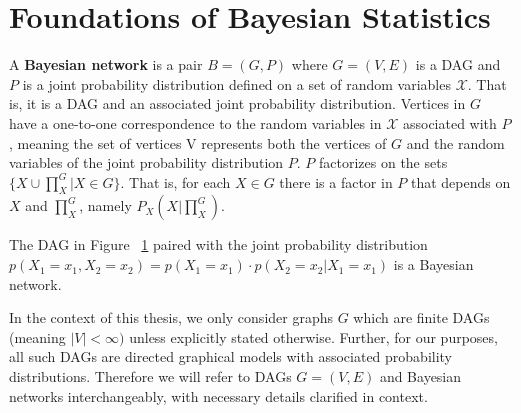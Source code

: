 \section{Foundations of Bayesian Statistics}

\begin{definition}
A \textbf{Bayesian network} is a pair $B = (G,P)$ where $G=(V,E)$ is a DAG and $P$ is a joint probability distribution defined on a set of random variables $\mathcal{X}$. That is, it is a DAG and an associated joint probability distribution. \newline
\null \quad \quad Vertices in $G$ have a one-to-one correspondence to the random variables in $\mathcal{X}$ associated with $P$, meaning the set of vertices V represents both the vertices of $G$ and the random variables of the joint probability distribution $P$. \newline
\null \quad \quad $P$ factorizes on the sets $\{X \cup \prod\nolimits_{X}^{G}|X\in G\}$. That is, for each $X \in G$ there is a factor in $P$ that depends on $X$ and $\prod\nolimits_{X}^{G}$, namely $P_{X}(X|\prod\nolimits_{X}^{G})$.
\end{definition}

\begin{example} The DAG in Figure ~\ref{fig:bayesiannet1} paired with the joint probability distribution $p(X_{1}=x_{1},X_{2}=x_{2}) = p(X_{1}=x_{1})\cdot p(X_{2}=x_{2}|X_{1}=x_{1})$ is a Bayesian network. 

\begin{figure}[h!]
\centering
{}
\caption{}
\label{fig:bayesiannet1}
\end{figure}
\end{example}

\begin{remark}
In the context of this thesis, we only consider graphs $G$ which are finite DAGs (meaning $|V| < \infty)$ unless explicitly stated otherwise. Further, for our purposes, all such DAGs are directed graphical models with associated probability distributions. Therefore we will refer to DAGs $G=(V,E)$ and Bayesian networks interchangeably, with necessary details clarified in context. 
\end{remark}

